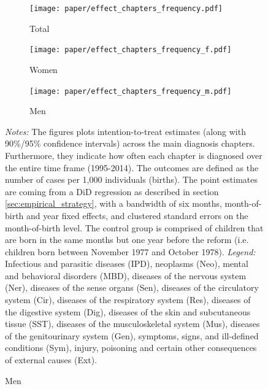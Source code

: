 \documentclass[11pt, a4paper]{article} %
\begin{document}
\begin{landscape}
	\vspace*{\fill}
	\begin{figure}[H]\centering
		\caption{Intention-to-treat effects across \textbf{main diagnosis chapters}}\label{fig: DD_across_main chapters}
		\begin{subfigure}[h]{0.31\linewidth}\centering\caption{Total}
			\texttt{[image: paper/effect\_chapters\_frequency.pdf]}
		\end{subfigure}
		\begin{subfigure}[h]{0.31\linewidth}\centering\caption{Women}
			\texttt{[image: paper/effect\_chapters\_frequency\_f.pdf]}
		\end{subfigure}
		\begin{subfigure}[h]{0.31\linewidth}\centering\caption{Men}
			\texttt{[image: paper/effect\_chapters\_frequency\_m.pdf]}
		\end{subfigure}
		\scriptsize
		\begin{minipage}{\linewidth}
			\emph{Notes:} The figures plots intention-to-treat estimates (along with 90\%/95\% confidence intervals) across the main diagnosis chapters. Furthermore, they indicate how often each chapter is diagnosed over the entire time frame (1995-2014). The outcomes are defined as the number of cases per 1,000 individuals (births). The point estimates are coming from a DiD regression as described in section \ref{sec:empirical_strategy}, with a bandwidth of six months, month-of-birth and year fixed effects, and clustered standard errors on the month-of-birth level. The control group is comprised of children	that are born in the same months but one year before the reform (i.e. children born between November 1977 and October 1978). \newline
			\emph{Legend:} Infectious and parasitic diseases (IPD), neoplasms (Neo), mental and behavioral disorders (MBD), diseases of the nervous system (Ner), diseases of the sense organs (Sen), diseases of the circulatory system (Cir), diseases of the respiratory system (Res), diseases of the digestive system (Dig), diseases of the skin and subcutaneous tissue (SST), diseases of the musculoskeletal system (Mus), diseases of the genitourinary system (Gen), symptoms, signs, and ill-defined conditions (Sym), injury, poisoning and certain other consequences of external causes (Ext).
			
		\end{minipage}
	\end{figure}
	\vspace*{\fill}\clearpage
\end{landscape}
\end{document}
